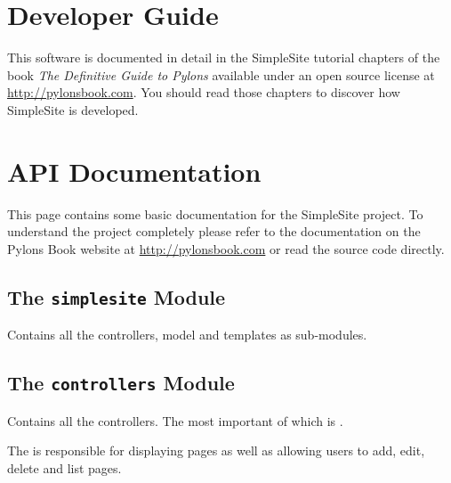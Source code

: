 \documentclass[letterpaper,10pt,english]{sphinxmanual}
\begin{document}
\chapter{Developer Guide}
\label{developer_guide::doc}\label{developer_guide:ethnologue-web-site}\label{developer_guide:developer-guide}
This software is documented in detail in the SimpleSite tutorial chapters of the
book \emph{The Definitive Guide to Pylons} available under an open source license at
\href{http://pylonsbook.com}{http://pylonsbook.com}. You should read those chapters to discover how SimpleSite
is developed.


\chapter{API Documentation}
\label{api:api-documentation}\label{api::doc}
This page contains some basic documentation for the SimpleSite project. To
understand the project completely please refer to the documentation on the
Pylons Book website at \href{http://pylonsbook.com}{http://pylonsbook.com} or read the source code directly.


\section{The \texttt{simplesite} Module}
\label{api:module-simplesite}\label{api:the-simplesite-module}
Contains all the controllers, model and templates as sub-modules.


\section{The \texttt{controllers} Module}
\label{api:the-controllers-module}\label{api:module-simplesite.controllers}
Contains all the controllers. The most important of which is
{\hyperref[api:simplesite.controllers.PageController]{}}.

\begin{fulllineitems}
\label{api:simplesite.controllers.PageController}
\end{fulllineitems}


The {\hyperref[api:simplesite.controllers.PageController]{}} is responsible for displaying pages as well as
allowing users to add, edit, delete and list pages.
\end{document}

